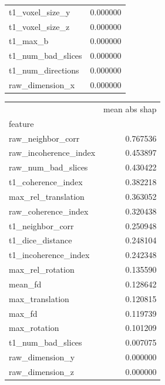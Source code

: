 \documentclass[fleqn,10pt,inline]{wlscirep}
\begin{document}
\begin{appendixbox}
\begin{multicols}{2}
\begin{tabular}{lr|}
t1\_voxel\_size\_y       &                  0.000000 \\
t1\_voxel\_size\_z       &                  0.000000 \\
t1\_max\_b              &                  0.000000 \\
t1\_num\_bad\_slices     &                  0.000000 \\
t1\_num\_directions     &                  0.000000 \\
raw\_dimension\_x       &                  0.000000 \\
\bottomrule
\end{tabular}

{\nolinenumbers
\begin{tabular}{|lr}
\toprule
{} &  mean abs shap \\
feature               &                           \\
\midrule
raw\_neighbor\_corr     &                  0.767536 \\
raw\_incoherence\_index &                  0.453897 \\
raw\_num\_bad\_slices    &                  0.430422 \\
t1\_coherence\_index    &                  0.382218 \\
max\_rel\_translation   &                  0.363052 \\
raw\_coherence\_index   &                  0.320438 \\
t1\_neighbor\_corr      &                  0.250948 \\
t1\_dice\_distance      &                  0.248104 \\
t1\_incoherence\_index  &                  0.242348 \\
max\_rel\_rotation      &                  0.135590 \\
mean\_fd               &                  0.128642 \\
max\_translation       &                  0.120815 \\
max\_fd                &                  0.119739 \\
max\_rotation          &                  0.101209 \\
t1\_num\_bad\_slices     &                  0.007075 \\
raw\_dimension\_y       &                  0.000000 \\
raw\_dimension\_z       &                  0.000000 \\

\end{tabular}}
\end{multicols}
\end{appendixbox}
\end{document}
